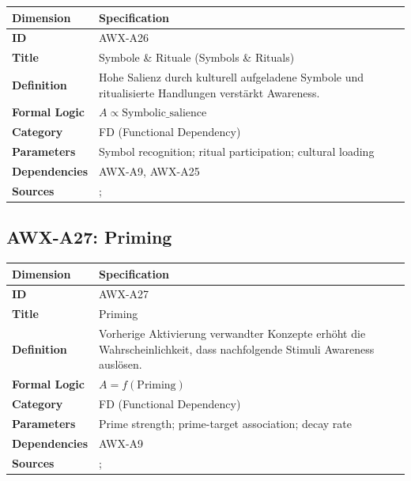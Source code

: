 \begin{table}[htbp]
\small
\begin{tabular}{p{3cm}p{11cm}}
\toprule
\textbf{Dimension} & \textbf{Specification} \\
\midrule
\textbf{ID} & AWX-A26 \\
\textbf{Title} & Symbole \& Rituale (Symbols \& Rituals) \\
\textbf{Definition} & Hohe Salienz durch kulturell aufgeladene Symbole und ritualisierte Handlungen verstärkt Awareness. \\
\textbf{Formal Logic} & $A \propto \text{Symbolic\_salience}$ \\
\textbf{Category} & FD (Functional Dependency) \\
\textbf{Parameters} & Symbol recognition; ritual participation; cultural loading \\
\textbf{Dependencies} & AWX-A9, AWX-A25 \\
\textbf{Sources} & \citet{PAP-akerlof2000identity}; \citet{akerlof2010identity} \\
\bottomrule
\end{tabular}
\end{table}


\subsection{AWX-A27: Priming}

\begin{table}[htbp]
\small
\begin{tabular}{p{3cm}p{11cm}}
\toprule
\textbf{Dimension} & \textbf{Specification} \\
\midrule
\textbf{ID} & AWX-A27 \\
\textbf{Title} & Priming \\
\textbf{Definition} & Vorherige Aktivierung verwandter Konzepte erhöht die Wahrscheinlichkeit, dass nachfolgende Stimuli Awareness auslösen. \\
\textbf{Formal Logic} & $A = f(\text{Priming})$ \\
\textbf{Category} & FD (Functional Dependency) \\
\textbf{Parameters} & Prime strength; prime-target association; decay rate \\
\textbf{Dependencies} & AWX-A9 \\
\textbf{Sources} & \citet{bargh1996automaticity}; \citet{PAP-kahneman2003maps} \\
\bottomrule
\end{tabular}
\end{table}

